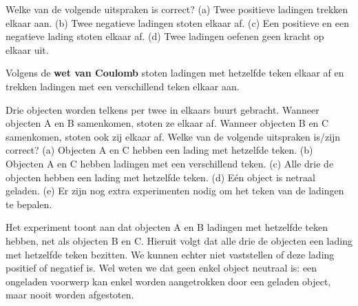 \documentclass{ximera}
\begin{document}
\begin{question}
	Welke van de volgende uitspraken is correct? (a) Twee positieve ladingen trekken elkaar aan. (b) Twee negatieve ladingen stoten elkaar af. (c) Een positieve en een negatieve lading stoten elkaar af. (d) Twee ladingen oefenen geen kracht op elkaar uit.
	\begin{onlineOnly}
		\begin{selectAll}
		\end{selectAll}

		\begin{solution}
		Volgens de \textbf{wet van Coulomb} stoten ladingen met hetzelfde teken elkaar af en trekken ladingen met een verschillend teken elkaar aan.
		\end{solution}
	\end{onlineOnly}
\end{question}
\begin{question}
	Drie objecten worden telkens per twee in elkaars buurt gebracht. Wanneer objecten A en B samenkomen, stoten ze elkaar af. Wanneer objecten B en C samenkomen, stoten ook zij elkaar af. Welke van de volgende uitspraken is/zijn correct? (a) Objecten A en C hebben een lading met hetzelfde teken. (b) Objecten A en C hebben ladingen met een verschillend teken. (c) Alle drie de objecten hebben een lading met hetzelfde teken. (d) Eén object is netraal geladen. (e) Er zijn nog extra experimenten nodig om het teken van de ladingen te bepalen.
	\begin{onlineOnly}
		\begin{selectAll}
			\choice[correct]{$a$}
			\choice{$b$}
			\choice[correct]{$c$}
			\choice{$d$}
			\choice[correct]{$e$}
		\end{selectAll}
		\begin{solution}
			Het experiment toont aan dat objecten A en B ladingen met hetzelfde teken hebben, net als objecten B en C. Hieruit volgt dat alle drie de objecten een lading met hetzelfde teken bezitten. We kunnen echter niet vaststellen of deze lading positief of negatief is. Wel weten we dat geen enkel object neutraal is: een ongeladen voorwerp kan enkel worden aangetrokken door een geladen object, maar nooit worden afgestoten.
		\end{solution}
	\end{onlineOnly}
\end{question}
\end{document}
